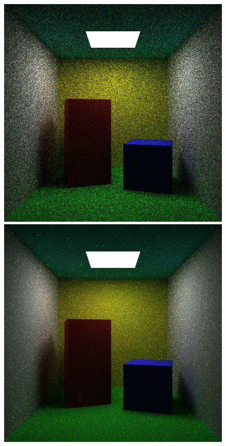 \documentclass[ %
                    author={Callum Pearce},
                supervisor={Dr. Neill Campbell},
                    degree={MEng},
                     title={Learning the incident radiance for a continuous state space rather than a discrete one is more beneficial for Importance Sampling in Monte Carlo Path Tracing},
                  subtitle={},
                      type={research},
                      year={2019} ]{dissertation}
\begin{document}
\begin{figure}[h]
\centering
{}
  \includegraphics[width=\textwidth]{images/renders/cornell/default.png}   
\endminipage\hspace{1em}
  \includegraphics[width=\textwidth]{images/renders/cornell/sarsa.png}   

\end{figure}
\end{document}
